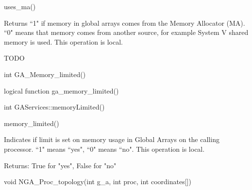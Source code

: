 \documentclass[12pt]{article}
\begin{document}
\begin{pyapi}
\begin{pycode}
uses_ma()
\end{pycode}
\end{pyapi} 
 
\local

\begin{desc}

Returns ``1" if memory in global arrays comes from the Memory Allocator (MA). 
``0" means that memory comes from another source, for example System V shared 
memory is used.
This operation is local.

TODO
\end{desc}


\begin{capi}
\begin{ccode}
int GA_Memory_limited()
\end{ccode}
\end{capi}

\begin{fapi}
\begin{fcode}
logical function ga_memory_limited()
\end{fcode}
\end{fapi}

\begin{cxxapi}
\begin{cxxcode}
int GAServices::memoryLimited()
\end{cxxcode}
\end{cxxapi}

\begin{pyapi}
\begin{pycode}
memory_limited() 
\end{pycode}
\end{pyapi}
\local

\begin{desc}

Indicates if limit is set on memory usage in Global Arrays on the calling processor. 
``1" means ``yes", ``0" means ``no".
This operation is local.

Returns: 
True for "yes", False for "no"
\end{desc}


\begin{capi}
\begin{ccode}
void NGA_Proc_topology(int g_a, int proc, int coordinates[])
\end{ccode}
\begin{funcargs}
\end{funcargs}
\end{capi}
\end{document}

